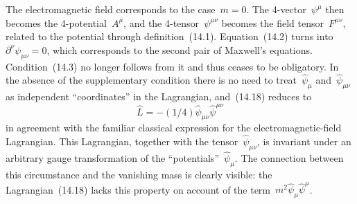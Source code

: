 The electromagnetic field corresponds to the case~$m = 0$. The 4-vector~$\psi^\mu$ then becomes the 4-potential~$A^\mu$, and the 4-tensor~$\psi^{\mu\nu}$ becomes the field tensor~$F^{\mu\nu}$, related to the potential through definition~(14.1). Equation~(14.2) turns into~$\partial^\nu\psi_{\mu\nu} = 0$, which corresponds to the second pair of Maxwell's equations. Condition~(14.3) no longer follows from it and thus ceases to be obligatory. In the absence of the supplementary condition there is no need to treat~$\hat{\psi}_\mu$ and~$\hat{\psi}_{\mu\nu}$ as independent
``coordinates'' in the Lagrangian, and~(14.18) reduces to
\begin{equation}
\hat{L} = -(1/4)\hat{\psi}_{\mu\nu}\hat{\psi}^{\mu\nu}
\tag{14.19}
\end{equation}
in agreement with the familiar classical expression for the electromagnetic-field Lagrangian. This Lagrangian, together with the tensor~$\hat{\psi}_{\mu\nu}$, is invariant under an arbitrary gauge transformation of the ``potentials''~$\hat{\psi}_\mu$. The connection between this circumstance and the vanishing mass is clearly visible: the Lagrangian~(14.18) lacks this property on account of the term~$m^2\hat{\psi}_\mu\hat{\psi}^\mu$.
